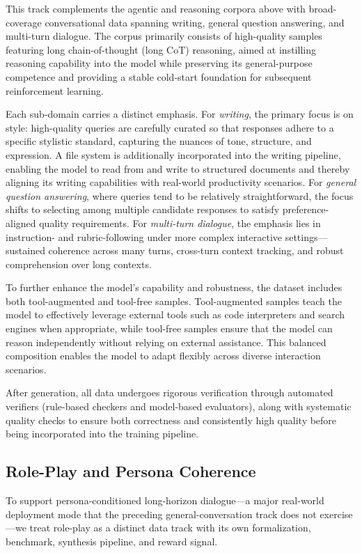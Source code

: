 This track complements the agentic and reasoning corpora above with broad-coverage conversational data spanning writing, general question answering, and multi-turn dialogue. The corpus primarily consists of high-quality samples featuring long chain-of-thought (long CoT) reasoning, aimed at instilling reasoning capability into the model while preserving its general-purpose competence and providing a stable cold-start foundation for subsequent reinforcement learning.

Each sub-domain carries a distinct emphasis. For \textit{writing}, the primary focus is on style: high-quality queries are carefully curated so that responses adhere to a specific stylistic standard, capturing the nuances of tone, structure, and expression. A file system is additionally incorporated into the writing pipeline, enabling the model to read from and write to structured documents and thereby aligning its writing capabilities with real-world productivity scenarios. For \textit{general question answering}, where queries tend to be relatively straightforward, the focus shifts to selecting among multiple candidate responses to satisfy preference-aligned quality requirements. For \textit{multi-turn dialogue}, the emphasis lies in instruction- and rubric-following under more complex interactive settings---sustained coherence across many turns, cross-turn context tracking, and robust comprehension over long contexts.

To further enhance the model's capability and robustness, the dataset includes both tool-augmented and tool-free samples. Tool-augmented samples teach the model to effectively leverage external tools such as code interpreters and search engines when appropriate, while tool-free samples ensure that the model can reason independently without relying on external assistance. This balanced composition enables the model to adapt flexibly across diverse interaction scenarios.

After generation, all data undergoes rigorous verification through automated verifiers (rule-based checkers and model-based evaluators), along with systematic quality checks to ensure both correctness and consistently high quality before being incorporated into the training pipeline.

\subsection{Role-Play and Persona Coherence}

To support persona-conditioned long-horizon dialogue---a major real-world deployment mode that the preceding general-conversation track does not exercise---we treat role-play as a distinct data track with its own formalization, benchmark, synthesis pipeline, and reward signal.

